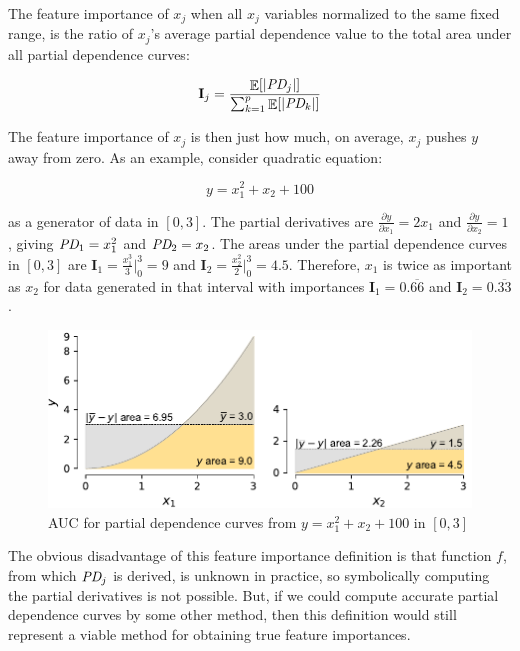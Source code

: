 \documentclass[12pt]{article}
\newcommand{\Ex}{\mathop{\mathbb{E}}}
\newcommand{\Imp}{\mathbf{I}}
\begin{document}
~\\
 The feature importance of $x_j$ when all $x_j$ variables normalized to the same fixed range, is the ratio of $x_j$'s average partial dependence value to the total area under all partial dependence curves:

\begin{equation}\label{eq:Epd2a}
\Imp_j = \frac{\Ex[|\text{\it PD}_j|]}{\sum_{k=1}^p \Ex[|\text{\it PD}_k|]}
\end{equation}

\noindent The feature importance of $x_j$ is then just how much, on average, $x_j$ pushes $y$ away from zero.   As an example, consider quadratic equation:

\begin{equation}\label{eq:quad}
y = x_1^2 + x_2 + 100
\end{equation}

\noindent as a generator of data in $[0,3]$. The partial derivatives are $\frac{\partial y}{\partial x_1} = 2 x_1$ and $\frac{\partial y}{\partial x_2} = 1$, giving $\text{\it PD}_1 = x_1^2$ and $\text{\it PD}_2 = x_2$. The areas under the partial dependence curves in $[0,3]$ are $\Imp_1 = \frac{x_1^3}{3} \big |_0^3 = 9$ and $\Imp_2 = \frac{x_2^2}{2} \big |_0^3 = 4.5$.   Therefore, $x_1$ is twice as important as $x_2$ for data generated in that interval with importances $\Imp_1 = 0.\overline{66}$ and $\Imp_2 = 0.\overline{33}$.

\begin{figure}[htbp]
\begin{center}
\includegraphics[scale=0.5]{images/quadratic-auc.pdf}
\caption{AUC for partial dependence curves from $y = x_1^2 + x_2 + 100$ in $[0,3]$}
\label{fig:diff-models}
\end{center}
\end{figure}

The obvious disadvantage of this feature importance definition is that function $f$, from which $\text{\it PD}_j$ is derived, is unknown in practice, so symbolically computing the partial derivatives is not possible. But, if we could compute accurate partial dependence curves by some other method, then this definition would still represent a viable method for obtaining true feature importances. 
\end{document}
